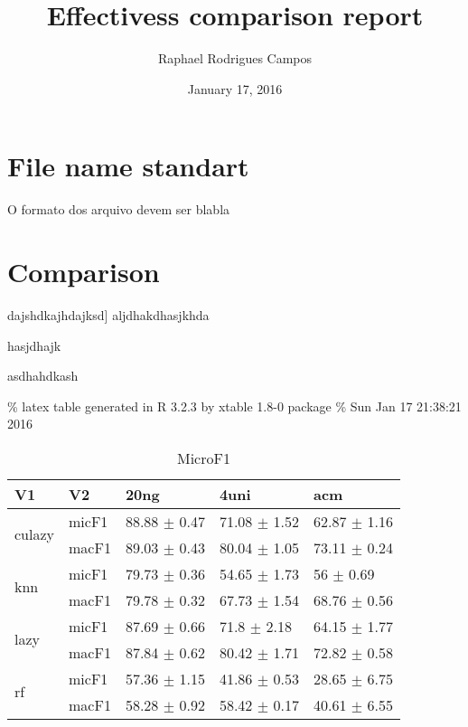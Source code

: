\documentclass[]{article}
\title{Effectivess comparison report}
\author{Raphael Rodrigues Campos}
\date{January 17, 2016}
\begin{document}
\maketitle


\section{File name standart}\label{file-name-standart}

O formato dos arquivo devem ser blabla

\section{Comparison}\label{comparison}

dajshdkajhdajksd{]} aljdhakdhasjkhda

hasjdhajk

asdhahdkash

\% latex table generated in R 3.2.3 by xtable 1.8-0 package \% Sun Jan
17 21:38:21 2016

\begin{table}[ht]
\centering
\begin{tabular}{lllll}
  \hline
V1 & V2 & 20ng & 4uni & acm \\ 
  \hline
\multirow{2}{*}{culazy} & micF1 & 88.88 $\pm$  0.47 & 71.08 $\pm$  1.52 & 62.87 $\pm$  1.16 \\ 
   & macF1 & 89.03 $\pm$  0.43 & 80.04 $\pm$  1.05 & 73.11 $\pm$  0.24 \\ 
  \multirow{2}{*}{knn} & micF1 & 79.73 $\pm$  0.36 & 54.65 $\pm$  1.73 & 56 $\pm$  0.69 \\ 
   & macF1 & 79.78 $\pm$  0.32 & 67.73 $\pm$  1.54 & 68.76 $\pm$  0.56 \\ 
  \multirow{2}{*}{lazy} & micF1 & 87.69 $\pm$  0.66 & 71.8 $\pm$  2.18 & 64.15 $\pm$  1.77 \\ 
   & macF1 & 87.84 $\pm$  0.62 & 80.42 $\pm$  1.71 & 72.82 $\pm$  0.58 \\ 
  \multirow{2}{*}{rf} & micF1 & 57.36 $\pm$  1.15 & 41.86 $\pm$  0.53 & 28.65 $\pm$  6.75 \\ 
   & macF1 & 58.28 $\pm$  0.92 & 58.42 $\pm$  0.17 & 40.61 $\pm$  6.55 \\ 
   \hline
\end{tabular}
\caption{MicroF1} 
\end{table}
\end{document}
